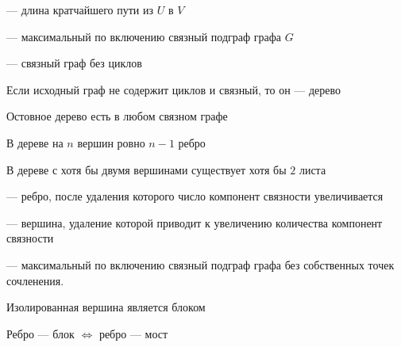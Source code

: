 \begin{definition}
	 --- длина кратчайшего пути из $U$ в $V$ 
\end{definition}

\begin{definition}
	 --- максимальный по включению связный подграф графа $G$ 
\end{definition}

\begin{definition}
	 --- связный граф без циклов
\end{definition}

\begin{remark}
	Если исходный граф не содержит циклов и связный, то он --- дерево
\end{remark}

\begin{remark}
	Остовное дерево есть в любом связном графе
\end{remark}

\begin{remark}
	В дереве на $n$ вершин ровно $n-1$ ребро
\end{remark}

\begin{remark}
	В дереве с хотя бы двумя вершинами существует хотя бы $2$ листа
\end{remark}

\begin{definition}
	 --- ребро, после удаления которого число компонент связности увеличивается
\end{definition}

\begin{definition}
	 --- вершина, удаление которой приводит к увеличению количества компонент
	связности
\end{definition}

\begin{definition}
	 --- максимальный по включению связный подграф графа без собственных точек сочленения. 
\end{definition}

\begin{remark}
	Изолированная вершина является блоком
\end{remark}

\begin{remark}
	Ребро --- блок $ \iff$ ребро --- мост
\end{remark}

